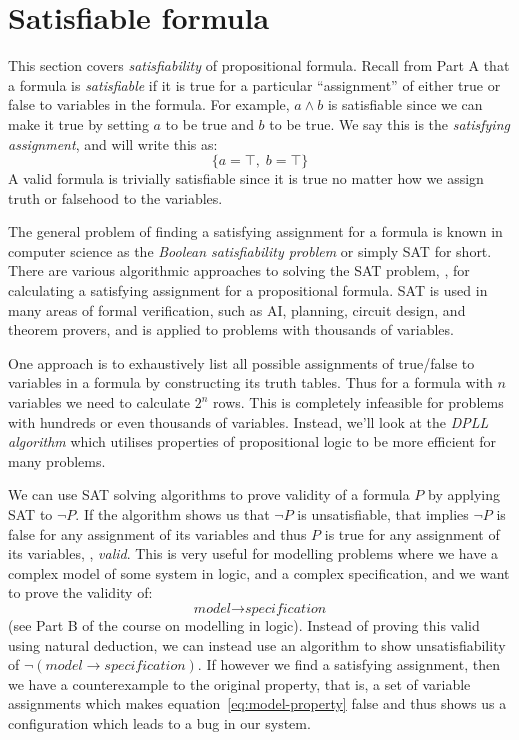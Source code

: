 \newcommand{\subst}[3]{\textit{replace}(#2, #1, #3)}

\newcommand{\highlight}[1]{%
 \underline{\colorbox{yellow!50}{$\displaystyle#1$}}}

\section{Satisfiable formula}

This section covers \emph{satisfiability} of propositional
formula. Recall from Part A that a formula is \emph{satisfiable} if it
is true for a particular ``assignment'' of either true or false to
variables in the formula. For example, $a \wedge b$ is satisfiable
since we can make it true by setting $a$ to be true and $b$ to be
true. We say this is the \emph{satisfying assignment}, and will write
this as:
%
\begin{equation*}
\{a = \top, \; b = \top\}
\end{equation*}
%
A valid formula is trivially satisfiable since it is true no matter
how we assign truth or falsehood to the variables.

The general problem of finding a satisfying assignment for a formula
is known in computer science as the \emph{Boolean satisfiability
  problem} or simply SAT for short. There are various
algorithmic approaches to solving the SAT problem, \ie{}, for
calculating a satisfying assignment for a propositional formula.  SAT
is used in many areas of formal verification, such as AI, planning,
circuit design, and theorem provers, and is applied to problems with
thousands of variables.

One approach is to exhaustively list all possible assignments of
true/false to variables in a formula by constructing its truth
tables. Thus for a formula with $n$ variables we need to calculate
$2^n$ rows. This is completely infeasible for problems with hundreds
or even thousands of variables. Instead, we'll look at the \emph{DPLL
  algorithm} which utilises properties of propositional
logic to be more efficient for many problems.

We can use SAT solving algorithms to prove validity of a formula $P$
by applying SAT to $\neg P$. If the algorithm shows us that $\neg P$
is unsatisfiable, that implies $\neg P$ is false for any assignment of
its variables and thus $P$ is true for any assignment of its
variables, \ie{}, \emph{valid}. This is very useful for modelling
problems where we have a complex model of some system in logic, and a
complex specification, and we want to prove the validity of:
\begin{equation}
\textit{model} \rightarrow \textit{specification}
\label{eq:model-property}
\end{equation}
(see Part B of the course on modelling in logic). Instead of proving
this valid using natural deduction, we can instead use an algorithm
to show unsatisfiability of
$\neg (\textit{model} \rightarrow \textit{specification})$. If however
we find a satisfying assignment, then we have a counterexample to the
original property, that is, a set of variable assignments which makes
equation~\eqref{eq:model-property} false and thus shows us
a configuration which leads to a bug in our system.

